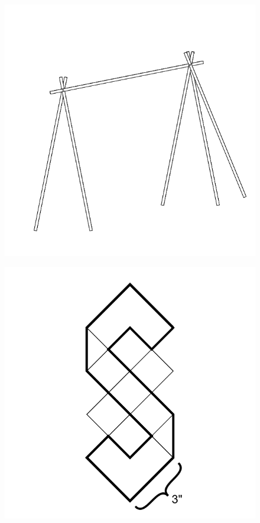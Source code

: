 \documentclass[17pt]{extreport}
\begin{document}
	\begin{figure}
		\centering
		\includegraphics[width=6.25in]{imageserver/uploadimages/image9.png}
	\end{figure}
	
	\begin{figure}
		\centering
		\includegraphics[width=6.25in]{imageserver/uploadimages/image10.png}
	\end{figure}
	
\end{document}
